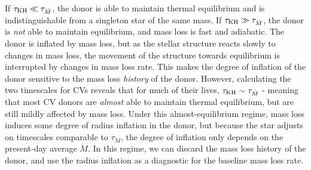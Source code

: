 If $\tau_{\rm KH} \ll \tau_{\dot M}$, the donor is able to maintain thermal equilibrium and is indistinguishable from a singleton star of the same mass.
If $\tau_{\rm KH} \gg \tau_{\dot M}$, the donor is \textit{not} able to maintain equilibrium, and mass loss is fast and adiabatic.
The donor is inflated by mass loss, but as the stellar structure reacts slowly to changes in mass loss, the movement of the structure towards equilibrium is interrupted by changes in mass loss rate. This makes the degree of inflation of the donor sensitive to the mass loss \textit{history} of the donor.
However, calculating the two timescales for CVs reveals that for much of their lives, $\tau_{\rm KH} \sim \tau_{\dot M}$ \citep{knigge11} - meaning that most CV donors are \textit{almost} able to maintain thermal equilibrium, but are still mildly affected by mass loss.
Under this almost-equilibrium regime, mass loss induces some degree of radius inflation in the donor, but because the star adjusts on timescales comparable to $\tau_{\dot M}$, the degree of inflation only depends on the present-day average $\dot M$. In this regime, we can discard the mass loss history of the donor, and use the radius inflation as a diagnostic for the baseline mass loss rate.


